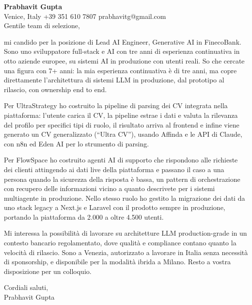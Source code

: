 \documentclass[a4paper,10.5pt]{article}
\begin{document}
\textbf{Prabhavit Gupta}\\
Venice, Italy \textbar{} +39 351 610 7807 \textbar{} prabhavitg@gmail.com\\[10pt]
Gentile team di selezione,

mi candido per la posizione di Lead AI Engineer, Generative AI in FinecoBank. Sono uno sviluppatore full-stack e AI con tre anni di esperienza continuativa in otto aziende europee, su sistemi AI in produzione con utenti reali. So che cercate una figura con 7+ anni: la mia esperienza continuativa è di tre anni, ma copre direttamente l'architettura di sistemi LLM in produzione, dal prototipo al rilascio, con ownership end to end.

Per UltraStrategy ho costruito la pipeline di parsing dei CV integrata nella piattaforma: l'utente carica il CV, la pipeline estrae i dati e valuta la rilevanza del profilo per specifici tipi di ruolo, il risultato arriva al frontend e infine viene generato un CV generalizzato (``Ultra CV''), usando Affinda e le API di Claude, con n8n ed Eden AI per lo strumento di parsing.

Per FlowSpace ho costruito agenti AI di supporto che rispondono alle richieste dei clienti attingendo ai dati live della piattaforma e passano il caso a una persona quando la sicurezza della risposta è bassa, un pattern di orchestrazione con recupero delle informazioni vicino a quanto descrivete per i sistemi multiagente in produzione. Nello stesso ruolo ho gestito la migrazione dei dati da uno stack legacy a Next.js e Laravel con il prodotto sempre in produzione, portando la piattaforma da 2.000 a oltre 4.500 utenti.

Mi interessa la possibilità di lavorare su architetture LLM production-grade in un contesto bancario regolamentato, dove qualità e compliance contano quanto la velocità di rilascio. Sono a Venezia, autorizzato a lavorare in Italia senza necessità di sponsorship, e disponibile per la modalità ibrida a Milano. Resto a vostra disposizione per un colloquio.

Cordiali saluti,\\
Prabhavit Gupta
\end{document}

